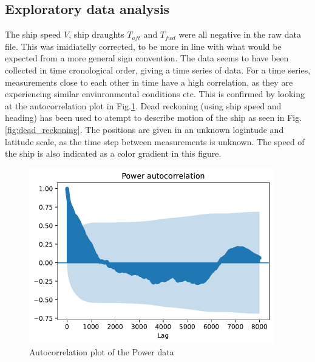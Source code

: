 \subsection*{Exploratory data analysis}\label{exploratory-data-analysis}
The ship speed $V$, ship draughts $T_{aft}$ and $T_{fwd}$ were all
negative in the raw data file. This was imidiatelly corrected, to be
more in line with what would be expected from a more general sign
convention. The data seems to have been collected in time cronological
order, giving a time series of data. For a time series, measurements
close to each other in time have a high correlation, as they are
experiencing similar envinronmental conditions etc. This is confirmed by
looking at the autocorrelation plot in
Fig.\ref{fig:power_autocorrelation}. Dead reckoning (using ship
speed and heading) has been used to atempt to describe motion of the
ship as seen in Fig.\ref{fig:dead_reckoning}. The positions are
given in an unknown logintude and latitude scale, as the time step
between measurements is unknown. The speed of the ship is also indicated
as a color gradient in this figure.
\begin{figure}[H]
\begin{center}\includegraphics[width = 0.95\textwidth]{figures/power_autocorrelation.pdf}\end{center}
\vspace{-0.7cm}
\caption{Autocorrelation plot of the Power data}
\label{fig:power_autocorrelation}
\end{figure}
